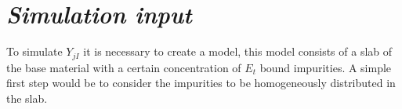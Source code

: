 \documentclass{article}
\begin{document}
\section*{\textit{Simulation input}}
To simulate $Y_{jI}$ it is necessary to create a model, this model
consists of a slab of the base material with a certain concentration
of $E_t$ bound impurities. A simple first step would be to consider
the impurities to be homogeneously distributed in the slab.


\end{document}
